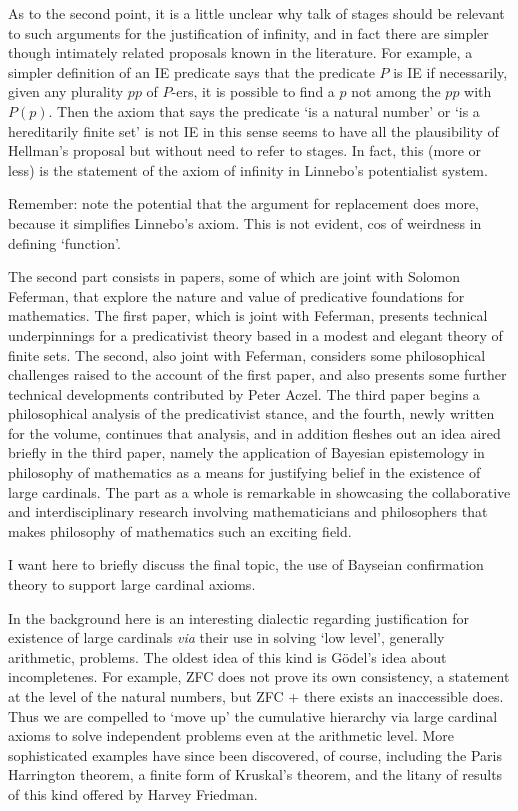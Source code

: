 \documentclass{asl}
\theoremstyle{definition}
\begin{document}
As to the second point, it is a little unclear why talk of stages 
should be relevant to such arguments for the justification of infinity, 
and in fact there are simpler though intimately related proposals known 
in the literature. For example, a simpler definition of an IE predicate says 
that the predicate $P$ is IE if necessarily, given any plurality $pp$ of $P$-ers, 
it is possible to find a $p$ not among the $pp$ with $P(p)$. 
Then the axiom that says the predicate `is a natural number' or 
`is a hereditarily finite set' is not IE in this sense seems to have 
all the plausibility of Hellman's proposal but without need to refer to stages. 
In fact, this (more or less) is the statement of the axiom of infinity in 
Linnebo's potentialist system.

Remember: note the potential that the argument for replacement does more,
because it simplifies Linnebo's axiom. This is not evident, 
cos of weirdness in defining `function'.


The second part consists in papers, some of which are joint with Solomon Feferman, that explore the nature and value of predicative foundations for mathematics. The first paper, which is joint with Feferman, presents technical underpinnings for a predicativist theory based in a modest and elegant theory of finite sets. The second, also joint with Feferman, considers some philosophical challenges raised to the account of the first paper, and also presents some further technical developments contributed by Peter Aczel. The third paper begins a philosophical analysis of the predicativist stance, and the fourth, newly written for the volume, continues that analysis, and in addition fleshes out an idea aired briefly in the third paper, namely the application of Bayesian epistemology in philosophy of mathematics as a means for justifying belief in the existence of large cardinals. The part as a whole is remarkable in showcasing the collaborative and interdisciplinary research involving mathematicians and philosophers that makes philosophy of mathematics such an exciting field.

I want here to briefly discuss the final topic, the use of Bayseian confirmation theory to support large cardinal axioms.

In the background here is an interesting dialectic regarding justification for existence of large cardinals \emph{via} their use in solving `low level', generally arithmetic, problems. The oldest idea of this kind is G\"odel's idea about incompletenes. For example, ZFC does not prove its own consistency, a statement at the level of the natural numbers, but ZFC + there exists an inaccessible does. Thus we are compelled to `move up' the cumulative hierarchy via large cardinal axioms to solve independent problems even at the arithmetic level. More sophisticated examples have since been discovered, of course, including the Paris Harrington theorem, a finite form of Kruskal's theorem, and the litany of results of this kind offered by Harvey Friedman.
\end{document}
